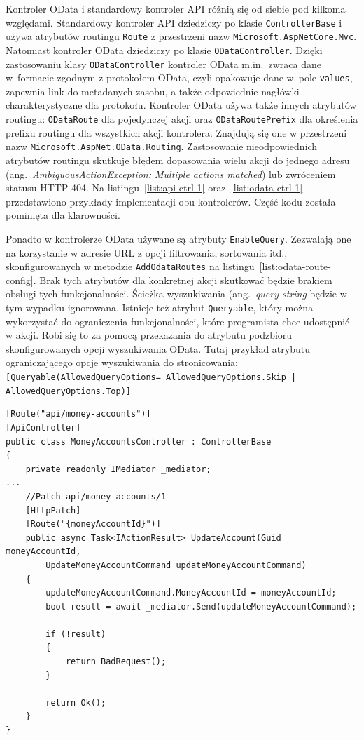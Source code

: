 Kontroler OData i standardowy kontroler API różnią się od siebie pod kilkoma względami. Standardowy kontroler API dziedziczy po klasie \texttt{ControllerBase} i używa atrybutów routingu \texttt{Route} z przestrzeni nazw \texttt{Microsoft.AspNetCore.Mvc}. Natomiast kontroler OData dziedziczy po klasie \texttt{ODataController}. Dzięki zastosowaniu klasy \texttt{ODataController} kontroler OData m.in.~zwraca dane w~formacie zgodnym z protokołem OData, czyli opakowuje dane w~pole \texttt{values}, zapewnia link do metadanych zasobu, a także odpowiednie nagłówki charakterystyczne dla protokołu. Kontroler OData używa także innych atrybutów routingu: \texttt{ODataRoute} dla pojedynczej akcji oraz \texttt{ODataRoutePrefix} dla określenia prefixu routingu dla wszystkich akcji kontrolera. Znajdują się one w przestrzeni nazw \texttt{Microsoft.AspNet.OData.Routing}. Zastosowanie nieodpowiednich atrybutów routingu skutkuje błędem dopasowania wielu akcji do jednego adresu (ang.~\emph{AmbiguousActionException: Multiple actions matched}) lub zwróceniem statusu HTTP 404. Na listingu~\ref{list:api-ctrl-1} oraz~\ref{list:odata-ctrl-1} przedstawiono przykłady implementacji obu kontrolerów. Część kodu została pominięta dla klarowności.

Ponadto w kontrolerze OData używane są atrybuty \texttt{EnableQuery}. Zezwalają one na korzystanie w adresie URL z opcji filtrowania, sortowania itd., skonfigurowanych w metodzie \texttt{AddOdataRoutes} na listingu~\ref{list:odata-route-config}. Brak tych atrybutów dla konkretnej akcji skutkować będzie brakiem obsługi tych funkcjonalności. Ścieżka wyszukiwania (ang.~\emph{query string} będzie w tym wypadku ignorowana. Istnieje też atrybut \texttt{Queryable}, który można wykorzystać do ograniczenia funkcjonalności, które programista chce udostępnić w akcji. Robi się to za pomocą przekazania do atrybutu podzbioru skonfigurowanych opcji wyszukiwania OData. Tutaj przykład atrybutu ograniczającego opcje wyszukiwania do stronicowania: \texttt{[Queryable(AllowedQueryOptions=
    AllowedQueryOptions.Skip | AllowedQueryOptions.Top)]}

{\belowcaptionskip=-10pt
\begin{lstlisting}[label=list:api-ctrl-1,
    caption=Przykład implementacji standardowego kontrolera API]
[Route("api/money-accounts")]
[ApiController]
public class MoneyAccountsController : ControllerBase
{
    private readonly IMediator _mediator;
...
    //Patch api/money-accounts/1
    [HttpPatch]
    [Route("{moneyAccountId}")]
    public async Task<IActionResult> UpdateAccount(Guid moneyAccountId,
        UpdateMoneyAccountCommand updateMoneyAccountCommand)
    {
        updateMoneyAccountCommand.MoneyAccountId = moneyAccountId;
        bool result = await _mediator.Send(updateMoneyAccountCommand);
    
        if (!result)
        {
            return BadRequest();
        }
    
        return Ok();
    }
}
\end{lstlisting}
}

